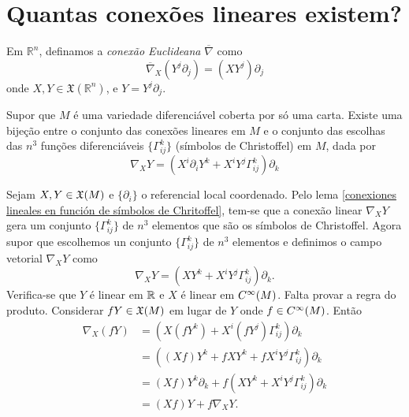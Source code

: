 \section{Quantas conexões lineares existem?}

\begin{definicao}
	Em $\mathbb{R}^n$, definamos a \emph{conexão Euclideana} $\overline{\nabla}$ como
	\begin{equation*}
		\overline{\nabla}_X \left( Y^j \partial_j \right) = (X Y^j) \partial_j
	\end{equation*}
	onde $X,Y \in \mathfrak{X}(\mathbb{R}^n)$, e $Y = Y^j \partial_j$.
\end{definicao}

\begin{lema}\label{bijecao-entre-a-escolha-dos-simbolos-de-christoffel-e-as-conexoes-lineares}
	Supor que $M$ é uma variedade diferenciável coberta por só uma carta. Existe uma bijeção entre o conjunto das conexões lineares em $M$ e o conjunto das escolhas das $n^3$ funções diferenciáveis $\{ \Gamma^k_{ij} \}$ (símbolos de Christoffel) em $M$, dada por
	\begin{equation*}
		\nabla_X Y = \left( X^i \partial_i Y^k + X^i Y^j \Gamma^k_{ij} \right) \partial_k
	\end{equation*}
\end{lema}

\begin{demonstracao}
	Sejam $X,Y \in \mathfrak{X}(M)$ e $\{ \partial_i \}$ o referencial local coordenado. Pelo lema \ref{conexiones lineales en función de símbolos de Chritoffel}, tem-se que a conexão linear $\nabla_X Y$ gera um conjunto $\{ \Gamma_{ij}^k \}$ de $n^3$ elementos que são os símbolos de Christoffel. Agora supor que escolhemos un conjunto $\{ \Gamma_{ij}^k \} $ de $n^3$ elementos e definimos o campo vetorial $\nabla_X Y$ como
	\begin{equation*}
		\nabla_X Y = (X Y^k + X^i Y^j \Gamma_{ij}^k) \partial_k.
	\end{equation*}
	Verifica-se que $Y$ é linear em $\mathbb{R}$ e $X$ é linear em $C^\infty(M)$. Falta provar a regra do produto. Considerar $fY \in \mathfrak{X}(M)$ em lugar de $Y$ onde $f \in C^\infty(M)$. Então
	\begin{align*}
		\nabla_X (fY) &= (X(f Y^k) + X^i (f Y^j) \Gamma_{ij}^k) \partial_k\\
		&= ( (Xf) Y^k + f X Y^k + f X^i Y^j \Gamma_{ij}^k ) \partial_k\\
		&= (Xf) Y^k \partial_k + f (X Y^k + X^i Y^j \Gamma_{ij}^k) \partial_k\\
		&= (Xf) Y + f \nabla_X Y.
	\end{align*}
\end{demonstracao}

